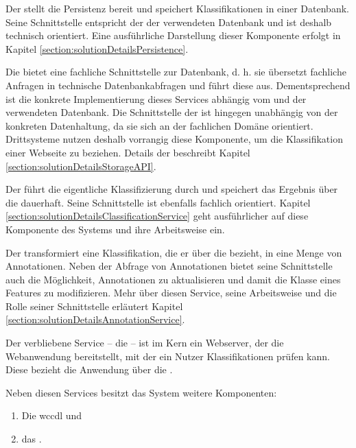         Der {\classificationStorage} stellt die Persistenz bereit und speichert
        Klassifikationen in einer Datenbank.
        Seine Schnittstelle entspricht der der verwendeten Datenbank und ist deshalb
        technisch orientiert.
        Eine ausführliche Darstellung dieser Komponente erfolgt in
        Kapitel \ref{section:solutionDetailsPersistence}.

        Die {\classificationStorageAPI} bietet eine fachliche Schnittstelle zur Datenbank,
        d. h. sie übersetzt fachliche Anfragen in technische Datenbankabfragen und führt diese aus.
        Dementsprechend ist die konkrete Implementierung dieses Services abhängig vom {\classificationStorage}
        und der verwendeten Datenbank.
        Die Schnittstelle der {\classificationStorageAPI}
        ist hingegen unabhängig von der konkreten Datenhaltung,
        da sie sich an der fachlichen Domäne orientiert.
        Drittsysteme nutzen deshalb vorrangig diese Komponente, um die Klassifikation einer Webseite zu beziehen.
        Details der {\classificationStorageAPI} beschreibt Kapitel \ref{section:solutionDetailsStorageAPI}.

        Der {\classificationService} führt die eigentliche Klassifizierung durch
        und speichert das Ergebnis über die {\classificationStorageAPI} dauerhaft.
        Seine Schnittstelle ist ebenfalls fachlich orientiert.
        Kapitel \ref{section:solutionDetailsClassificationService} geht ausführlicher auf diese Komponente
        des Systems und ihre Arbeitsweise ein.

        Der {\annotationService} transformiert eine Klassifikation,
        die er über die {\classificationStorageAPI} bezieht,
        in eine Menge von Annotationen.
        Neben der Abfrage von Annotationen bietet seine Schnittstelle auch
        die Möglichkeit, Annotationen zu aktualisieren und damit die Klasse eines Features zu modifizieren.
        Mehr über diesen Service, seine Arbeitsweise und die Rolle seiner Schnittstelle
        erläutert Kapitel \ref{section:solutionDetailsAnnotationService}.

        Der verbliebene Service -- die {\webAppService} -- ist im Kern ein Webserver,
        der die Webanwendung bereitstellt,
        mit der ein Nutzer Klassifikationen prüfen kann.
        Diese bezieht die Anwendung über die {\classificationStorageAPI}.

        Neben diesen Services besitzt das System weitere Komponenten:

        \begin{enumerate}
            \item Die \gls{wccdl} und
            \item das {\annotatorPlugin}.
        \end{enumerate}

